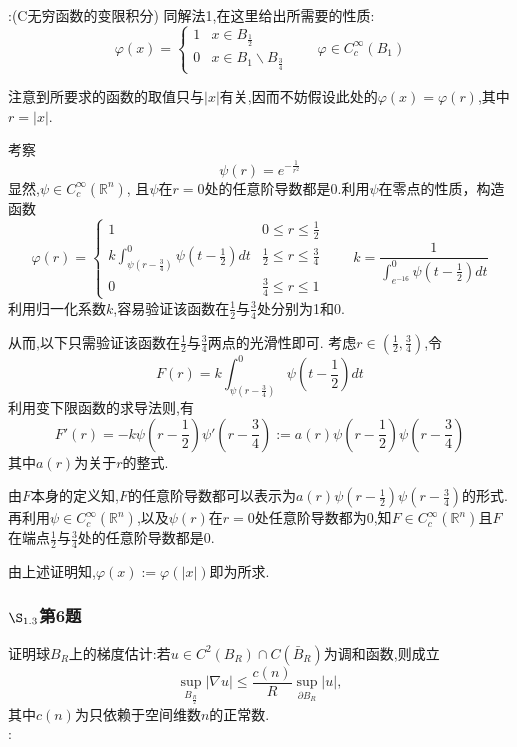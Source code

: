 \documentclass[12pt, a4paper]{ctexart}
\begin{document}
	\songti{}:(C无穷函数的变限积分)
	同解法1,在这里给出所需要的性质:$$
	\varphi(x)=\begin{cases}
	1 &  x\in B_{\frac{1}{2}}\\
	0 &  x \in B_1 \backslash B_{\frac{3}{4}}
	\end{cases}	\qquad \varphi \in C_{c}^{\infty}(B_1)$$
	
	注意到所要求的函数的取值只与$|x|$有关,因而不妨假设此处的$\varphi(x)=\varphi(r)$,其中$r=|x|$.
	
	考察$$
	\psi(r)=e^{-\frac{1}{r^2}} $$
	显然,$\psi \in C_{c}^{\infty}(\mathbb{R}^n)$,
	且$\psi$在$r=0$处的任意阶导数都是0.利用$\psi$在零点的性质，构造函数$$
	\varphi(r)=\begin{cases}
	1 &  0 \le r \le \frac{1}{2}\\
	k\int_{\psi(r-\frac{3}{4})}^{0}\psi(t-\frac{1}{2})dt &  \frac{1}{2} \le r \le \frac{3}{4}\\
	0 &  \frac{3}{4} \le r \le 1
	\end{cases}	\qquad k=\frac{1}{\int_{e^{-16}}^{0}\psi(t-\frac{1}{2})dt}$$
	利用归一化系数$k$,容易验证该函数在$\frac{1}{2}$与$\frac{3}{4}$处分别为1和0.
	
	从而,以下只需验证该函数在$\frac{1}{2}$与$\frac{3}{4}$两点的光滑性即可.
	考虑$r \in (\frac{1}{2},\frac{3}{4})$,令$$
	F(r)=k\int_{\psi(r-\frac{3}{4})}^{0}\psi(t-\frac{1}{2})dt$$
	利用变下限函数的求导法则,有$$
	F'(r)=-k\psi(r-\frac{1}{2})\psi'(r-\frac{3}{4}):=a(r)\psi(r-\frac{1}{2})\psi(r-\frac{3}{4})$$
	其中$a(r)$为关于$r$的整式.
	
	由$F$本身的定义知,$F$的任意阶导数都可以表示为$a(r)\psi(r-\frac{1}{2})\psi(r-\frac{3}{4})$的形式.再利用$\psi \in C_{c}^{\infty}(\mathbb{R}^n)$,以及$\psi (r)$在$r=0$处任意阶导数都为0,知$F \in C_{c}^{\infty}(\mathbb{R}^n)$且$F$在端点$\frac{1}{2}$与$\frac{3}{4}$处的任意阶导数都是0.
	
	由上述证明知,$\varphi(x):=\varphi(|x|)$即为所求.
	
	
	\subsubsection{$\S_{1.3}$第6题}
	\kaishu{}证明球$B_R$上的梯度估计:若$u \in C^2(B_R) \cap C(\bar{B}_R)$为调和函数,则成立$$
	\sup_{B_{\frac{R}{2}}} |\nabla u| \le \frac{c(n)}{R} \sup_{\partial B_R}|u|,	$$
	其中$c(n)$为只依赖于空间维数$n$的正常数.\\
	
	\songti{}:\\
	
\end{document}
